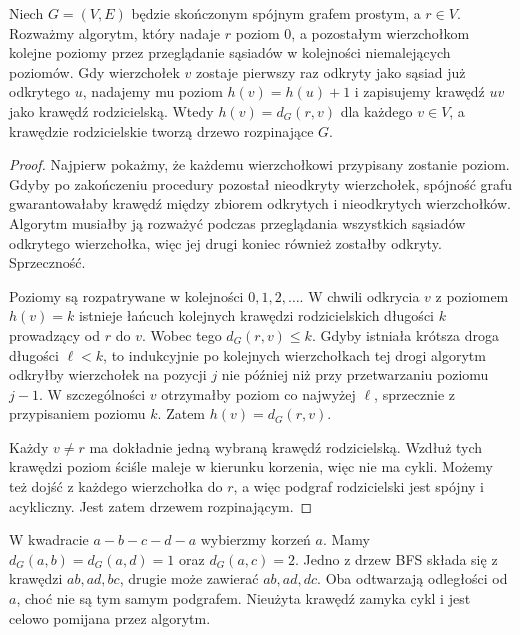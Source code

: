 \begin{twierdzenie}
Niech $G=(V,E)$ będzie skończonym spójnym
grafem prostym, a $r\in V$. Rozważmy algorytm,
który nadaje $r$ poziom $0$, a pozostałym
wierzchołkom kolejne poziomy przez przeglądanie
sąsiadów w kolejności niemalejących poziomów.
Gdy wierzchołek $v$ zostaje pierwszy raz
odkryty jako sąsiad już odkrytego $u$,
nadajemy mu poziom $h(v)=h(u)+1$ i zapisujemy
krawędź $uv$ jako krawędź rodzicielską.
Wtedy $h(v)=d_G(r,v)$ dla każdego $v\in V$,
a krawędzie rodzicielskie tworzą drzewo
rozpinające $G$.
\end{twierdzenie}

\begin{proof}
Najpierw pokażmy, że każdemu wierzchołkowi
przypisany zostanie poziom. Gdyby po zakończeniu
procedury pozostał nieodkryty wierzchołek,
spójność grafu gwarantowałaby krawędź między
zbiorem odkrytych i nieodkrytych wierzchołków.
Algorytm musiałby ją rozważyć podczas
przeglądania wszystkich sąsiadów odkrytego
wierzchołka, więc jej drugi koniec również
zostałby odkryty. Sprzeczność.

Poziomy są rozpatrywane w kolejności $0,1,2,\ldots$.
W chwili odkrycia $v$ z poziomem $h(v)=k$
istnieje łańcuch kolejnych krawędzi
rodzicielskich długości $k$ prowadzący od $r$
do $v$. Wobec tego $d_G(r,v)\le k$.
Gdyby istniała krótsza droga długości $\ell<k$,
to indukcyjnie po kolejnych wierzchołkach tej
drogi algorytm odkryłby wierzchołek na pozycji
$j$ nie później niż przy przetwarzaniu poziomu
$j-1$. W szczególności $v$ otrzymałby poziom
co najwyżej $\ell$, sprzecznie z przypisaniem
poziomu $k$. Zatem $h(v)=d_G(r,v)$.

Każdy $v\ne r$ ma dokładnie jedną wybraną
krawędź rodzicielską. Wzdłuż tych krawędzi
poziom ściśle maleje w kierunku korzenia,
więc nie ma cykli. Możemy też dojść z
każdego wierzchołka do $r$, a więc podgraf
rodzicielski jest spójny i acykliczny.
Jest zatem drzewem rozpinającym.
\end{proof}

\begin{przyklad}
W kwadracie $a-b-c-d-a$ wybierzmy korzeń $a$.
Mamy $d_G(a,b)=d_G(a,d)=1$ oraz $d_G(a,c)=2$.
Jedno z drzew BFS składa się z krawędzi
$ab,ad,bc$, drugie może zawierać $ab,ad,dc$.
Oba odtwarzają odległości od $a$, choć
nie są tym samym podgrafem. Nieużyta krawędź
zamyka cykl i jest celowo pomijana przez algorytm.
\end{przyklad}

